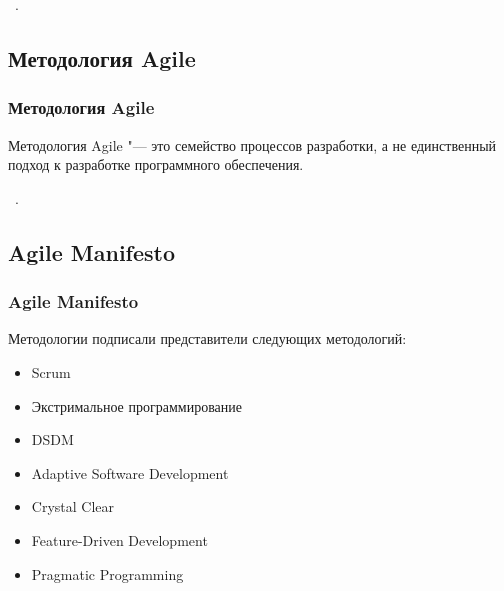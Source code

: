 \documentclass{../industrial-development}
\begin{document}
\lecturenotes

~\cite{Fowler}.



\subsection{Методология Agile}
\begin{frame} \frametitle{Методология Agile}
  \begin{block}{}
   \alert{Методология Agile} "--- это семейство процессов разработки, а не единственный подход к разработке программного обеспечения.
  \end{block}
\end{frame}

\lecturenotes

~\cite{Fowler}.


\subsection{Agile Manifesto}
\begin{frame} \frametitle{Agile Manifesto}
Методологии подписали представители следующих методологий:
	\begin{itemize}
	\item Scrum 
	\item Экстримальное программирование 
	\item DSDM 
	\item Adaptive Software Development 
	\item Crystal Clear 
	\item Feature-Driven Development 
	\item Pragmatic Programming 
	\end{itemize}
\end{frame}
\end{document}
